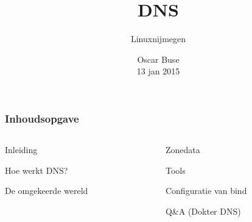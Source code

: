 \documentclass[t,xcolor=table]{beamer}
\title{DNS}
\subtitle{Linuxnijmegen}
\author{Oscar Buse\\
{\small 13 jan 2015}}
\date{}
\begin{document}
	\begin{frontframe}
		\titlepage
	\end{frontframe}

	\begin{sectionframe}
    \frametitle{Inhoudsopgave}
\vspace{-14pt}
    \fontsize{6}{9}\selectfont
    \begin{columns}[t]
        \begin{column}{.5\textwidth}
		\begin{block}{Inleiding}
            		\tableofcontents[sections={1}]
		\end{block}
                \begin{block}{Hoe werkt DNS?}
                        \tableofcontents[sections={2}]
                \end{block}
		\begin{block}{De omgekeerde wereld}
           		 \tableofcontents[sections={3}]
		\end{block}
        \end{column}
        \begin{column}{.5\textwidth}
                \begin{block}{Zonedata}
                         \tableofcontents[sections={4}]
                \end{block}
                \begin{block}{Tools}
                         \tableofcontents[sections={5}]
                \end{block}
                \begin{block}{Configuratie van bind}
                         \tableofcontents[sections={6}]
                \end{block}
                \begin{block}{Q\&A (Dokter DNS)}
                         \tableofcontents[sections={7}]
                \end{block}
        \end{column}
    \end{columns}
	\end{sectionframe}

	
\end{document}
